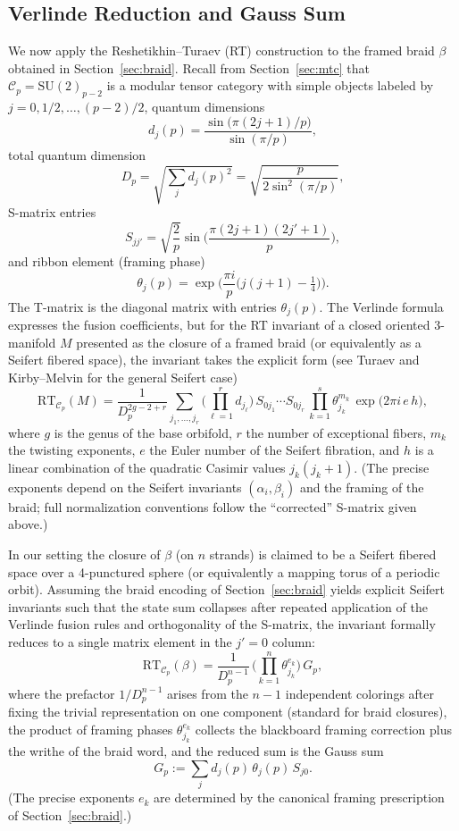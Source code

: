 \subsection{Verlinde Reduction and Gauss Sum}

We now apply the Reshetikhin--Turaev (RT) construction to the framed braid \(\beta\) obtained in Section~\ref{sec:braid}. Recall from Section~\ref{sec:mtc} that \(\mathcal{C}_p = \mathrm{SU}(2)_{p-2}\) is a modular tensor category with simple objects labeled by \(j = 0, 1/2, \dots, (p-2)/2\), quantum dimensions
\[
d_j(p) = \frac{\sin\bigl(\pi(2j+1)/p\bigr)}{\sin(\pi/p)},
\]
total quantum dimension
\[
D_p = \sqrt{\sum_j d_j(p)^2} = \sqrt{\frac{p}{2\sin^2(\pi/p)}},
\]
S-matrix entries
\[
S_{jj'} = \sqrt{\frac{2}{p}} \sin\biggl( \frac{\pi(2j+1)(2j'+1)}{p} \biggr),
\]
and ribbon element (framing phase)
\[
\theta_j(p) = \exp\biggl( \frac{\pi i}{p} \bigl( j(j+1) - \tfrac14 \bigr) \biggr).
\]
The T-matrix is the diagonal matrix with entries \(\theta_j(p)\). The Verlinde formula expresses the fusion coefficients, but for the RT invariant of a closed oriented 3-manifold \(M\) presented as the closure of a framed braid (or equivalently as a Seifert fibered space), the invariant takes the explicit form (see Turaev \cite{TuraevBook} and Kirby--Melvin \cite{KirbyMelvin} for the general Seifert case)
\[
\mathrm{RT}_{\mathcal{C}_p}(M) = \frac{1}{D_p^{2g-2 + r}} \sum_{j_1,\dots,j_r} \Biggl( \prod_{\ell=1}^r d_{j_\ell} \Biggr) \, S_{0j_1} \cdots S_{0j_r} \, \prod_{k=1}^s \theta_{j_k}^{m_k} \, \exp\bigl(2\pi i \, e \, h\bigr),
\]
where \(g\) is the genus of the base orbifold, \(r\) the number of exceptional fibers, \(m_k\) the twisting exponents, \(e\) the Euler number of the Seifert fibration, and \(h\) is a linear combination of the quadratic Casimir values \(j_k(j_k+1)\). (The precise exponents depend on the Seifert invariants \((\alpha_i,\beta_i)\) and the framing of the braid; full normalization conventions follow the ``corrected'' S-matrix given above.)

In our setting the closure of \(\beta\) (on \(n\) strands) is claimed to be a Seifert fibered space over a 4-punctured sphere (or equivalently a mapping torus of a periodic orbit). Assuming the braid encoding of Section~\ref{sec:braid} yields explicit Seifert invariants such that the state sum collapses after repeated application of the Verlinde fusion rules and orthogonality of the S-matrix, the invariant formally reduces to a single matrix element in the \(j'=0\) column:
\[
\mathrm{RT}_{\mathcal{C}_p}(\beta) = \frac{1}{D_p^{n-1}} \, \Biggl( \prod_{k=1}^{n} \theta_{j_k}^{e_k} \Biggr) \, G_p,
\]
where the prefactor \(1/D_p^{n-1}\) arises from the \(n-1\) independent colorings after fixing the trivial representation on one component (standard for braid closures), the product of framing phases \(\theta_{j_k}^{e_k}\) collects the blackboard framing correction plus the writhe of the braid word, and the reduced sum is the Gauss sum
\[
G_p := \sum_{j} d_j(p) \, \theta_j(p) \, S_{j0}.
\]
(The precise exponents \(e_k\) are determined by the canonical framing prescription of Section~\ref{sec:braid}.)


